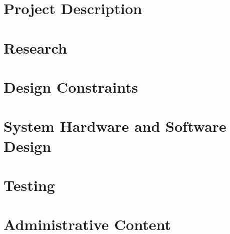 \documentclass[12pt]{article}
\begin{document}
\section{Project Description}                   %
\section{Research}                              %
\section{Design Constraints}                    %
\section{System Hardware and Software Design}   %
\section{Testing}                               %
\section{Administrative Content}                %
\end{document}
